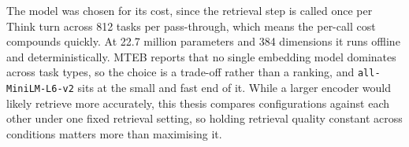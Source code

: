 The model was chosen for its cost, since the retrieval step is called once per Think turn across 812 tasks per pass-through, which means the per-call cost compounds quickly. At 22.7 million parameters and 384 dimensions it runs offline and deterministically. MTEB \citep{muennighoff2023mteb} reports that no single embedding model dominates across task types, so the choice is a trade-off rather than a ranking, and \texttt{all-MiniLM-L6-v2} sits at the small and fast end of it. While a larger encoder would likely retrieve more accurately, this thesis compares configurations against each other under one fixed retrieval setting, so holding retrieval quality constant across conditions matters more than maximising it.
